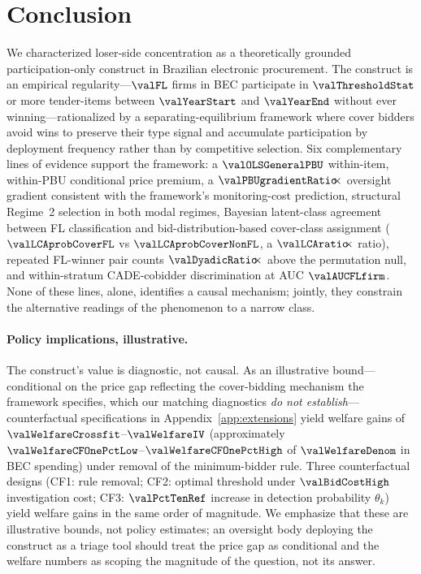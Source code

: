 
\section{Conclusion}
\label{sec:conclusion}

We characterized loser-side concentration as a theoretically grounded
participation-only construct in Brazilian electronic procurement.
The construct is an empirical regularity---$\valFL$ firms in BEC
participate in $\valThresholdStat$ or more tender-items between
$\valYearStart$ and $\valYearEnd$ without ever winning---rationalized
by a separating-equilibrium framework where cover bidders avoid wins
to preserve their type signal and accumulate participation by
deployment frequency rather than by competitive selection. Six
complementary lines of evidence support the framework: a
$\valOLSGeneralPBU$ within-item, within-PBU conditional price premium, a $\valPBUgradientRatio\!\!\times$
oversight gradient consistent with the framework's monitoring-cost
prediction, structural Regime~2 selection in both modal regimes,
Bayesian latent-class agreement between FL classification and
bid-distribution-based cover-class assignment ($\valLCAprobCoverFL$ vs
$\valLCAprobCoverNonFL$, a $\valLCAratio\!\!\times$ ratio), repeated
FL-winner pair counts $\valDyadicRatio\!\!\times$ above the permutation
null, and within-stratum CADE-cobidder discrimination at AUC
$\valAUCFLfirm$. None of these lines, alone, identifies a causal
mechanism; jointly, they constrain the alternative readings of the
phenomenon to a narrow class.

\paragraph{Policy implications, illustrative.}
The construct's value is diagnostic, not causal. As an illustrative
bound---conditional on the price gap reflecting the cover-bidding
mechanism the framework specifies, which our matching diagnostics
\emph{do not establish}---counterfactual specifications in
Appendix~\ref{app:extensions} yield welfare gains of
$\valWelfareCrossfit$--$\valWelfareIV$ (approximately $\valWelfareCFOnePctLow$--$\valWelfareCFOnePctHigh$
of $\valWelfareDenom$ in BEC spending) under removal of the minimum-bidder rule.
Three counterfactual designs (CF1: rule removal; CF2: optimal
threshold under $\valBidCostHigh$ investigation cost; CF3:
$\valPctTenRef$ increase in detection probability $\theta_k$) yield
welfare gains in the same order of magnitude. We emphasize that these
are illustrative bounds, not policy estimates; an oversight body
deploying the construct as a triage tool should treat the price gap
as conditional and the welfare numbers as scoping the magnitude of
the question, not its answer.

